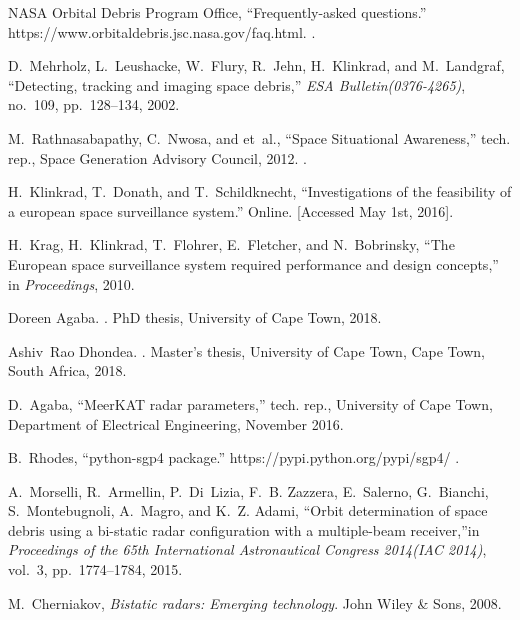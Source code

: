 \documentclass[conference]{IEEEtran}
\begin{document}
\begin{thebibliography}{99}
{NASA Orbital Debris Program Office}, ``Frequently-asked questions.''
https://www.orbitaldebris.jsc.nasa.gov/faq.html.
.

D.~Mehrholz, L.~Leushacke, W.~Flury, R.~Jehn, H.~Klinkrad, and M.~Landgraf,
``Detecting, tracking and imaging space debris,'' {\em {ESA Bulletin(0376-4265)}}, no.~109, pp.~128--134, 2002.

M.~Rathnasabapathy, C.~Nwosa, and et~al., ``{Space Situational Awareness},''
tech. rep., {Space Generation Advisory Council}, 2012.
.

H.~Klinkrad, T.~Donath, and T.~Schildknecht, ``Investigations of the
feasibility of a european space surveillance system.'' Online. [Accessed May
1st, 2016].
		
H.~Krag, H.~Klinkrad, T.~Flohrer, E.~Fletcher, and N.~Bobrinsky, ``{The
European space surveillance system required performance and design concepts},'' in {\em Proceedings}, 2010.

Doreen Agaba.
.
\newblock PhD thesis, {University of Cape Town}, 2018.

Ashiv~Rao Dhondea.
.
\newblock Master's thesis, {University of Cape Town}, Cape Town, South Africa,
  2018.

		D.~Agaba, ``{MeerKAT radar parameters},'' tech. rep., University of Cape Town,
		Department of Electrical Engineering, November 2016.

B.~Rhodes, ``python-sgp4 package.'' https://pypi.python.org/pypi/sgp4/
.
		
A.~Morselli, R.~Armellin, P.~Di~Lizia, F.~B. Zazzera, E.~Salerno, G.~Bianchi,
S.~Montebugnoli, A.~Magro, and K.~Z. Adami, ``Orbit determination of space debris using a bi-static radar configuration with a multiple-beam receiver,''in {\em Proceedings of the 65th International Astronautical Congress 2014(IAC 2014)}, vol.~3, pp.~1774--1784, 2015.
		
M.~Cherniakov, {\em Bistatic radars: Emerging technology}.
\newblock John Wiley \& Sons, 2008.
		

\end{thebibliography}
\end{document}
